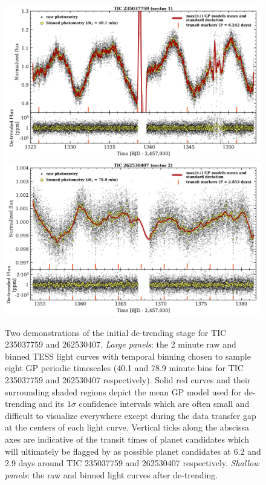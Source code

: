 \begin{figure}
  \centering
  \includegraphics[width=0.9\hsize]{figures/GPdetrend_235037759.png}
  \includegraphics[width=0.9\hsize]{figures/GPdetrend_262530407.png}
  \caption[Examples of GP detrending of TESS light curves.]
      {Two demonstrations of the \pipeline{} initial de-trending stage for TIC 235037759 and 262530407.
    \emph{Large panels}: the 2 minute raw and binned TESS light curves with temporal
    binning chosen to sample eight GP periodic timescales (40.1 and 78.9 minute bins for TIC 235037759
    and 262530407 respectively). Solid red curves and their surrounding shaded regions
    depict the mean GP model used for de-trending and its $1\sigma$ confidence intervals which are often
    small and difficult to visualize everywhere except during the data transfer gap at the centers of each
    light curve. Vertical ticks along the abscissa axes are indicative of the transit times of planet
    candidates which will ultimately be flagged by \pipeline{} as possible planet candidates at
    6.2 and 2.9 days around TIC 235037759 and 262530407 respectively. \emph{Shallow panels}: the raw and binned light curves after de-trending.}
  \label{fig:detrend}
\end{figure}

